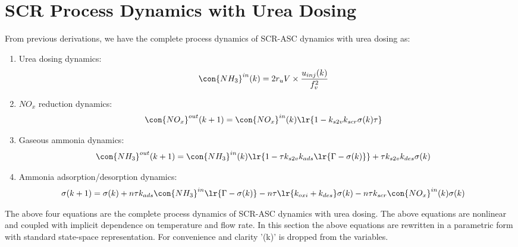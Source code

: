 \newpage
\section{SCR Process Dynamics with Urea Dosing \label{sec::proc_dyn}}
From previous derivations, we have the complete process dynamics of SCR-ASC dynamics with urea dosing as:

\begin{enumerate}
    \item Urea dosing dynamics:
    \begin{align*}
    \con{NH_3}^{in} (k) &= 2r_u V \times \frac{u_{inj}(k)}{f_v^2}
    \end{align*}

    \item $NO_x$ reduction dynamics:
    \begin{align*}
    \con{NO_x}^{out} (k + 1) &= \con{NO_x}^{in} (k) \lr{1 - k_{s2v} k_{scr} \sigma(k) \tau}
    \end{align*}

    \item Gaseous ammonia dynamics:
    \begin{align*}
    \con{NH_3}^{out} (k + 1) &= \con{NH_3}^{in}(k) \lr{1 - \tau k_{s2v}k_{ads} \lr{\Gamma - \sigma(k)}} + \tau k_{s2v} k_{des} \sigma(k)
    \end{align*}

    \item Ammonia adsorption/desorption dynamics:
 \begin{align*}
        \sigma(k + 1) &= \sigma(k)
        + n\tau k_{ads} \con{NH_3}^{in} \lr{\Gamma - \sigma(k)}
        - n \tau \lr{k_{oxi} + k_{des}} \sigma(k)
        - n \tau k_{scr} \con{NO_x}^{in}(k) \sigma(k)
    \end{align*}
\end{enumerate}

The above four equations are the complete process dynamics of SCR-ASC dynamics with urea dosing. The above equations are
nonlinear and coupled with implicit dependence on temperature and flow rate. In this section the above equations are
rewritten in a parametric form with standard state-space representation. For convenience and clarity '(k)' is dropped
from the variables.


